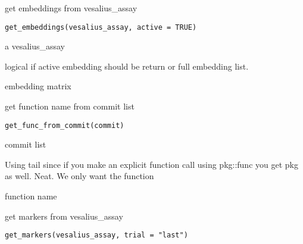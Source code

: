 \documentclass[a4paper]{book}
\begin{document}
%
\begin{Description}
get embeddings from vesalius\_assay
\end{Description}
%
\begin{Usage}
\begin{verbatim}
get_embeddings(vesalius_assay, active = TRUE)
\end{verbatim}
\end{Usage}
%
\begin{Arguments}
\begin{ldescription}
\item[\code{vesalius\_assay}] a vesalius\_assay

\item[\code{active}] logical if active embedding should be return 
or full embedding list.
\end{ldescription}
\end{Arguments}
%
\begin{Value}
embedding matrix
\end{Value}
%
\begin{Description}
get function name from commit list
\end{Description}
%
\begin{Usage}
\begin{verbatim}
get_func_from_commit(commit)
\end{verbatim}
\end{Usage}
%
\begin{Arguments}
\begin{ldescription}
\item[\code{commit}] commit list
\end{ldescription}
\end{Arguments}
%
\begin{Details}
Using tail since if you make an explicit function call
using pkg::func you get pkg as well. Neat. We only want the function
\end{Details}
%
\begin{Value}
function name
\end{Value}
%
\begin{Description}
get markers from vesalius\_assay
\end{Description}
%
\begin{Usage}
\begin{verbatim}
get_markers(vesalius_assay, trial = "last")
\end{verbatim}
\end{Usage}
\end{document}
